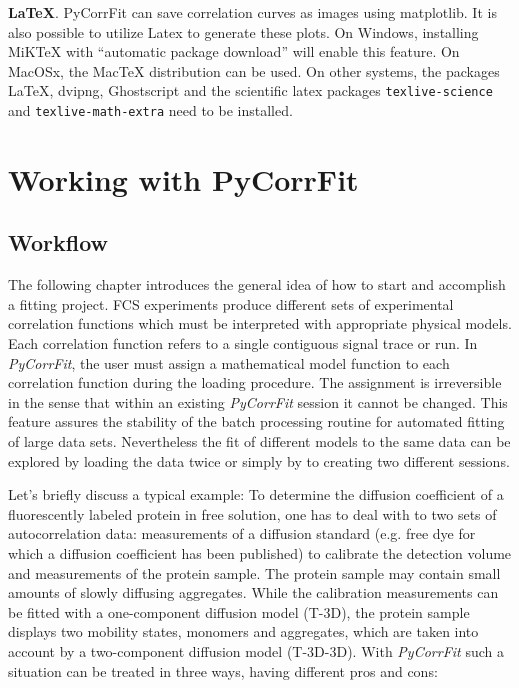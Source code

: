 \noindent \textbf{\LaTeX}.
PyCorrFit can save correlation curves as images using matplotlib. It is also possible to utilize Latex to generate these plots. On Windows, installing MiKTeX  with ``automatic package download'' will enable this feature. On MacOSx, the MacTeX distribution can be used. On other systems, the packages LaTeX, dvipng, Ghostscript and the scientific latex packages \texttt{texlive-science} and \texttt{texlive-math-extra} need to be installed.





\section{Working with PyCorrFit}


\subsection{Workflow}
\label{cha_graphint}
\label{sec:PyCorrFitUserInterface}

The following chapter introduces the general idea of how to start and accomplish a fitting project. FCS experiments produce different sets of experimental correlation functions which must be interpreted with appropriate physical models. Each correlation function refers to a single contiguous signal trace or {\textquotesingle}run{\textquotesingle}. In \textit{PyCorrFit}, the user must assign a mathematical model function to each correlation function during the loading procedure. The assignment is irreversible in the sense that within an existing \textit{PyCorrFit} session it cannot be changed. This feature assures the stability of the batch processing routine for automated fitting of large data sets. Nevertheless the fit of different models to the same data can be explored by loading the data twice or simply by to creating two different sessions.

Let's briefly discuss a typical example: To determine the diffusion coefficient of a fluorescently labeled protein in free solution, one has to deal with to two sets of autocorrelation data: measurements of a diffusion standard (e.g. free dye for which a diffusion coefficient has been published) to calibrate the detection volume and measurements of the protein sample. The protein sample may contain small amounts of slowly diffusing aggregates. While the calibration measurements can be fitted with a one-component diffusion model (T-3D), the protein sample displays two mobility states, monomers and aggregates, which are taken into account by a two-component diffusion model (T-3D-3D). With \textit{PyCorrFit} such a situation can be treated in three ways, having different pros and cons: 



